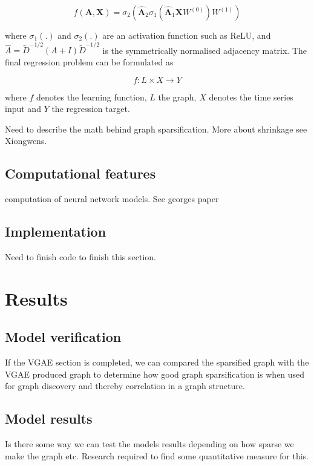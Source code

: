 \documentclass[honours,12pt]{unswthesis}
\numberwithin{equation}{section}
\begin{document}
\begin{equation}
f(\mathbf{A, X}) = \sigma_2( \mathbf{ \hat{A} }_2 \sigma_1 (\mathbf{ \hat{A} }_1 \mathbf{X} W^{(0)}) W^{(1)})
\end{equation}

\noindent where $\sigma_1(.)$ and $\sigma_2(.)$ are an activation function such as ReLU, and $\hat{A} = \tilde{D}^{-1/2} (A + I) \tilde{D}^{-1/2}$
is the symmetrically normalised adjacency matrix. The final regression problem can be formulated as

\begin{equation}
f : L \times X \rightarrow Y
\end{equation}

\noindent where $f$ denotes the learning function, $L$ the graph, $X$ denotes the time series input and $Y$ the regression target.

Need to describe the math behind graph sparsification. More about shrinkage see Xiongwens.

{\section{Computational features}}\label{computation}
computation of neural network models. See georges paper 
{\section{Implementation}}\label{implementation}

Need to finish code to finish this section.

\chapter{Results}\label{results}

{\section{Model verification}}\label{model-verification}
If the VGAE section is completed, we can compared the sparsified graph with the VGAE
produced graph to determine how good graph sparsification is when used for graph discovery
and thereby correlation in a graph structure.

{\section{Model results}}\label{model-results}
Is there some way we can test the models results depending on how sparse we make the graph etc.
Research required to find some quantitative measure for this.
\end{document}
